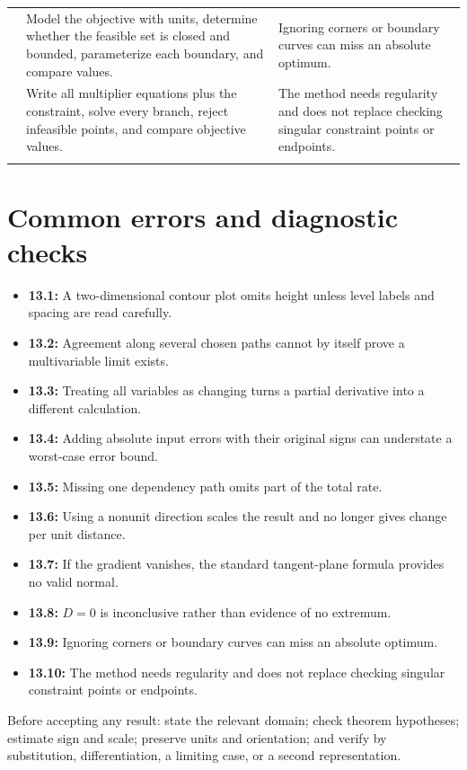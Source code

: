 \documentclass[11pt]{article}
\begin{document}
\begin{longtable}{@{}>{\RaggedRight\arraybackslash}p{}>{\RaggedRight\arraybackslash}p{}>{\RaggedRight\arraybackslash}p{}@{}}
13.9 & Model the objective with units, determine whether the feasible set is closed and bounded, parameterize each boundary, and compare values. & Ignoring corners or boundary curves can miss an absolute optimum. \\\addlinespace[2pt]
13.10 & Write all multiplier equations plus the constraint, solve every branch, reject infeasible points, and compare objective values. & The method needs regularity and does not replace checking singular constraint points or endpoints. \\\addlinespace[2pt]
\bottomrule
\end{longtable}
\normalsize

\section{Common errors and diagnostic checks}
\begin{warningbox}
\begin{itemize}
\item \textbf{13.1:} A two-dimensional contour plot omits height unless level labels and spacing are read carefully.
\item \textbf{13.2:} Agreement along several chosen paths cannot by itself prove a multivariable limit exists.
\item \textbf{13.3:} Treating all variables as changing turns a partial derivative into a different calculation.
\item \textbf{13.4:} Adding absolute input errors with their original signs can understate a worst-case error bound.
\item \textbf{13.5:} Missing one dependency path omits part of the total rate.
\item \textbf{13.6:} Using a nonunit direction scales the result and no longer gives change per unit distance.
\item \textbf{13.7:} If the gradient vanishes, the standard tangent-plane formula provides no valid normal.
\item \textbf{13.8:} $D=0$ is inconclusive rather than evidence of no extremum.
\item \textbf{13.9:} Ignoring corners or boundary curves can miss an absolute optimum.
\item \textbf{13.10:} The method needs regularity and does not replace checking singular constraint points or endpoints.
\end{itemize}
\end{warningbox}
\begin{checkbox}
Before accepting any result: state the relevant domain; check theorem hypotheses; estimate sign and scale; preserve units and orientation; and verify by substitution, differentiation, a limiting case, or a second representation.
\end{checkbox}
\end{document}
